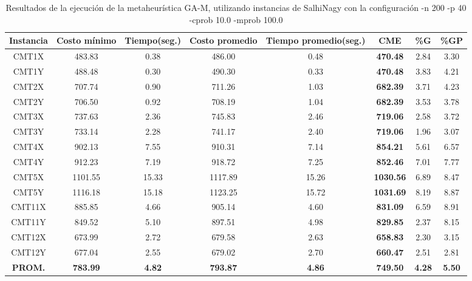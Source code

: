 \begin{table}[h]
\caption{Resultados de la ejecución de la metaheurística GA-M, utilizando instancias de SalhiNagy con la configuración -n 200 -p 40 -cprob 10.0 -mprob 100.0}
\centering
\small
\begin{tabular}{c c c c c c c c}
\hline\hline
Instancia & Costo mínimo & Tiempo(seg.) & Costo promedio & Tiempo promedio(seg.) & CME & \%G & \%GP \\ [0.5ex]
\hline
CMT1X & 483.83 & 0.38 & 
486.00 & 0.48 & \bf{470.48} & 
2.84 & 3.30\\CMT1Y & 488.48 & 0.30 & 
490.30 & 0.33 & \bf{470.48} & 
3.83 & 4.21\\CMT2X & 707.74 & 0.90 & 
711.26 & 1.03 & \bf{682.39} & 
3.71 & 4.23\\CMT2Y & 706.50 & 0.92 & 
708.19 & 1.04 & \bf{682.39} & 
3.53 & 3.78\\CMT3X & 737.63 & 2.36 & 
745.83 & 2.46 & \bf{719.06} & 
2.58 & 3.72\\CMT3Y & 733.14 & 2.28 & 
741.17 & 2.40 & \bf{719.06} & 
1.96 & 3.07\\CMT4X & 902.13 & 7.55 & 
910.31 & 7.14 & \bf{854.21} & 
5.61 & 6.57\\CMT4Y & 912.23 & 7.19 & 
918.72 & 7.25 & \bf{852.46} & 
7.01 & 7.77\\CMT5X & 1101.55 & 15.33 & 
1117.89 & 15.26 & \bf{1030.56} & 
6.89 & 8.47\\CMT5Y & 1116.18 & 15.18 & 
1123.25 & 15.72 & \bf{1031.69} & 
8.19 & 8.87\\CMT11X & 885.85 & 4.66 & 
905.14 & 4.60 & \bf{831.09} & 
6.59 & 8.91\\CMT11Y & 849.52 & 5.10 & 
897.51 & 4.98 & \bf{829.85} & 
2.37 & 8.15\\CMT12X & 673.99 & 2.72 & 
679.58 & 2.63 & \bf{658.83} & 
2.30 & 3.15\\CMT12Y & 677.04 & 2.55 & 
679.02 & 2.70 & \bf{660.47} & 
2.51 & 2.81\\\bf{PROM.} & 
\bf{783.99} & \bf{4.82} & \bf{793.87} & \bf{4.86} & \bf{749.50} & \bf{4.28} & \bf{5.50}\\[1ex]\hline
\end{tabular}
\label{table:nonlin}
\end{table} 

